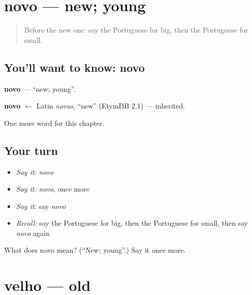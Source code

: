 \section[novo]{novo — new; young}

\label{lesson:PT-C64-novo}



\begin{quote}
Before the new one: say the Portuguese for big, then the Portuguese for small.
\end{quote}

\subsection*{You'll want to know: novo}
\textbf{novo} — \textquotedblleft{}new; young\textquotedblright{}.

\begin{cousinweb}
\textbf{novo} $\leftarrow$ Latin \emph{novus}, \textquotedblleft{}new\textquotedblright{} (EtymDB 2.1) — inherited.
\end{cousinweb}

\begin{grammarlens}[title={What you've built}]
One more word for this chapter.
\end{grammarlens}

\subsection*{Your turn}
\begin{itemize}
\raggedright
  \item \emph{Say it:} \emph{novo}
  \item \emph{Say it:} \emph{novo}, once more
  \item \emph{Say it:} say \emph{novo}
  \item \emph{Recall:} say the Portuguese for big, then the Portuguese for small, then say \emph{novo} again
\end{itemize}

\begin{tcolorbox}[breakable,colback=teal!4,colframe=teal!35!black,title={Before you move on}]
What does novo mean? (\textquotedblleft{}New; young\textquotedblright{}.) Say it once more.
\end{tcolorbox}
\section[velho]{velho — old}

